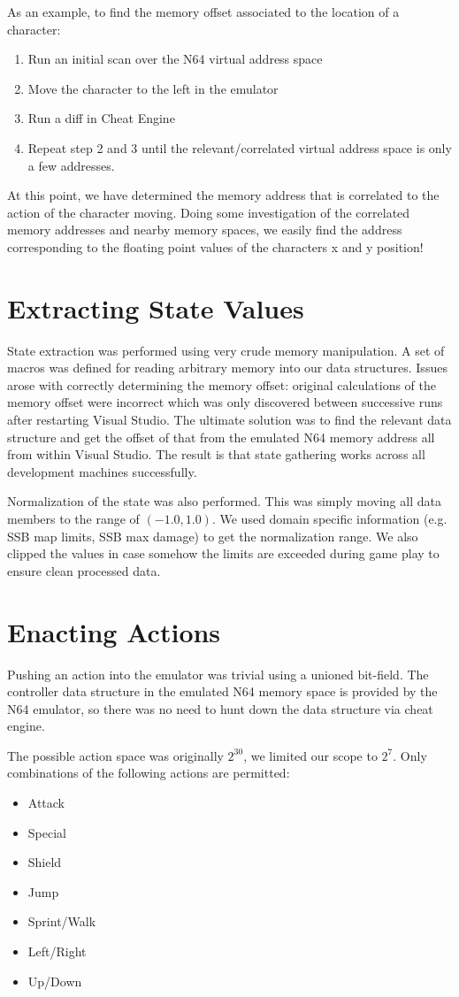 As an example, to find the memory offset associated to the location of a character:
\begin{enumerate}
\item Run an initial scan over the N64 virtual address space
\item Move the character to the left in the emulator
\item Run a diff in Cheat Engine
\item Repeat step 2 and 3 until the relevant/correlated virtual address space is only a few addresses.
\end{enumerate}
At this point, we have determined the memory address that is correlated to the action of the character moving.
Doing some investigation of the correlated memory addresses and nearby memory spaces, we easily find the address corresponding to the floating point values of the characters x and y position!

\section*{Extracting State Values}

State extraction was performed using very crude memory manipulation.
A set of macros was defined for reading arbitrary memory into our data structures.
Issues arose with correctly determining the memory offset: original calculations of the memory offset were incorrect which was only discovered between successive runs after restarting Visual Studio.
The ultimate solution was to find the relevant data structure and get the offset of that from the emulated N64 memory address all from within Visual Studio.
The result is that state gathering works across all development machines successfully.

Normalization of the state was also performed.
This was simply moving all data members to the range of $(-1.0, 1.0)$.
We used domain specific information (e.g. SSB map limits, SSB max damage) to get the normalization range.
We also clipped the values in case somehow the limits are exceeded during game play to ensure clean processed data.

\section*{Enacting Actions}

Pushing an action into the emulator was trivial using a unioned bit-field.
The controller data structure in the emulated N64 memory space is provided by the N64 emulator, so there was no need to hunt down the data structure via cheat engine.

The possible action space was originally $2^{30}$, we limited our scope to $2^7$. 
Only combinations of the following actions are permitted:
\begin{itemize}
  \item Attack
  \item Special
  \item Shield
  \item Jump
  \item Sprint/Walk
  \item Left/Right
  \item Up/Down
\end{itemize}
